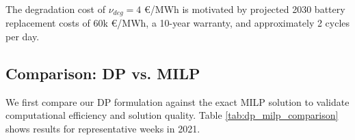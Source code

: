 \documentclass[10pt,twocolumn]{article}
\begin{document}
The degradation cost of $\nu_{deg} = 4$ €/MWh is motivated by projected 2030 battery replacement costs of 60k €/MWh, a 10-year warranty, and approximately 2 cycles per day.

\subsection{Comparison: DP vs. MILP}
We first compare our DP formulation against the exact MILP solution to validate computational efficiency and solution quality. Table \ref{tab:dp_milp_comparison} shows results for representative weeks in 2021.

\end{document}
